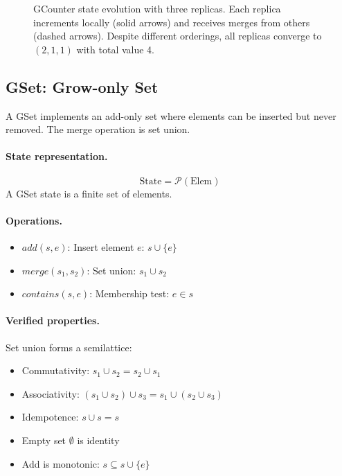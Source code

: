 \begin{figure}[t]
  \caption{GCounter state evolution with three replicas. Each replica increments locally (solid arrows) and receives merges from others (dashed arrows). Despite different orderings, all replicas converge to $(2,1,1)$ with total value 4.}
  \label{fig:gcounter-evolution}
\end{figure}

\subsection{GSet: Grow-only Set}

A GSet implements an add-only set where elements can be inserted but never removed. The merge operation is set union.

\paragraph{State representation.}
\[
\text{State} = \mathcal{P}(\text{Elem})
\]
A GSet state is a finite set of elements.

\paragraph{Operations.}
\begin{itemize}
  \item $\mathit{add}(s, e)$: Insert element $e$: $s \cup \{e\}$
  \item $\mathit{merge}(s_1, s_2)$: Set union: $s_1 \cup s_2$
  \item $\mathit{contains}(s, e)$: Membership test: $e \in s$
\end{itemize}

\paragraph{Verified properties.}
Set union forms a semilattice:
\begin{itemize}
  \item Commutativity: $s_1 \cup s_2 = s_2 \cup s_1$
  \item Associativity: $(s_1 \cup s_2) \cup s_3 = s_1 \cup (s_2 \cup s_3)$
  \item Idempotence: $s \cup s = s$
  \item Empty set $\emptyset$ is identity
  \item Add is monotonic: $s \subseteq s \cup \{e\}$
\end{itemize}

